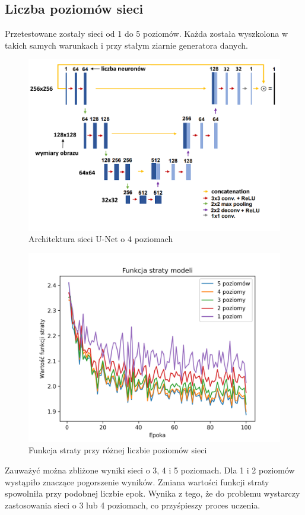 \documentclass[a4paper, 12pt]{article}
\begin{document}
\subsection{Liczba poziomów sieci}
Przetestowane zostały sieci od 1 do 5 poziomów. Każda została wyszkolona w takich samych warunkach i przy stałym ziarnie generatora danych.
\begin{figure}[h!]
\begin{center}
	\includegraphics[width=0.9\columnwidth]{unet4.png}
	\caption{Architektura sieci U-Net o 4 poziomach}
\end{center}
\end{figure}
\newpage
\begin{figure}[h!]
\begin{center}
	\includegraphics[width=0.7\columnwidth]{layers.png}
	\caption{Funkcja straty przy różnej liczbie poziomów sieci}
\end{center}
\end{figure}
Zauważyć można zbliżone wyniki sieci o 3, 4 i 5 poziomach.
Dla 1 i 2 poziomów wystąpiło znaczące pogorszenie wyników. Zmiana wartości funkcji straty spowolniła przy podobnej liczbie epok.
Wynika z tego, że do problemu wystarczy zastosowania sieci o 3 lub 4 poziomach, co przyśpieszy proces uczenia.
\end{document}
